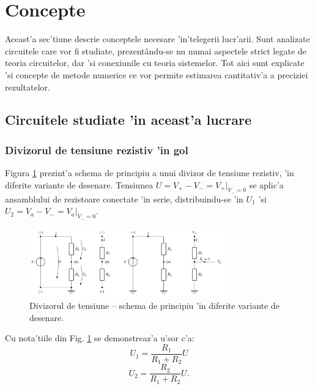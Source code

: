 \section{Concepte}

\begin{summary}
  Aceast'a sec'tiune descrie conceptele necesare 'in'telegerii lucr'arii. Sunt analizate circuitele care vor fi studiate, prezent\^andu-se nu numai aspectele strict legate de teoria circuitelor, dar 'si conexiunile cu teoria sistemelor. Tot aici sunt explicate 'si concepte de metode numerice ce vor permite estimarea cantitativ'a a preciziei rezultatelor.  
\end{summary}

\subsection*{Circuitele studiate 'in aceast'a lucrare}

\subsubsection*{\color{blue} Divizorul de tensiune rezistiv 'in gol}

Figura \ref{fig:divizor_schema} prezint'a schema de principiu a unui divizor de tensiune rezistiv, 'in diferite variante de desenare. Tensiunea $U = V_+ - V_- = V_+|_{V_-=0}$ se aplic'a ansamblului de rezistoare conectate 'in serie, distribuindu-se 'in $U_1$ 'si $U_2=V_a - V_- = V_a|_{V_-=0}$.
\begin{figure}[h]
	\centering
		\includegraphics[width=0.75\textwidth]{laborator_01/figuri/scheme_divizor}
	\caption{Divizorul de tensiune -- schema de principiu 'in diferite variante de desenare.}
	\label{fig:divizor_schema}
\end{figure}

Cu nota'tiile din Fig. \ref{fig:divizor_schema} se demonstreaz'a u'sor c'a:
\begin{equation} \label{eq:tensiune_intrare_gol}
U_1 = \frac{R_1}{R_1+R_2}U
\end{equation}
\begin{equation} \label{eq:tensiune_iesire_gol}
U_2 = \frac{R_2}{R_1+R_2}U.
\end{equation}

